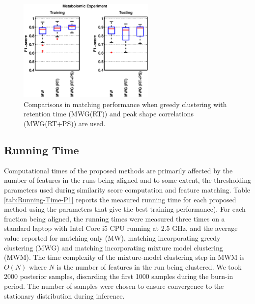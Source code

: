 \begin{figure}[!htbp]
\noindent \begin{centering}
\includegraphics[width=0.6\textwidth]{04-matching/figures/supp_figure_3}
\par\end{centering}

\caption{\label{fig:MWG-RT-andPS}Comparisons in matching performance when
greedy clustering with retention time (MWG(RT)) and peak shape correlations
(MWG(RT+PS)) are used.}
\end{figure}

\subsection{Running Time}

Computational times of the proposed methods are primarily affected by the number of features in the runs being aligned and to some extent, the thresholding parameters used during similarity score computation and feature matching. Table \ref{tab:Running-Time-P1} reports the measured running time for each proposed method using the parameters that give the best training performance). For each fraction being aligned, the running times were measured three times on a standard laptop with Intel Core i5 CPU running at 2.5 GHz, and the average value reported for matching only (MW), matching incorporating greedy clustering (MWG) and matching incorporating mixture model clustering (MWM). The time complexity of the mixture-model clustering step in MWM is $O(N)$ where $N$ is the number of features in the run being clustered. We took 2000 posterior samples, discarding the first 1000 samples during the burn-in period. The number of samples were chosen to ensure convergence to the stationary distribution during inference. 

